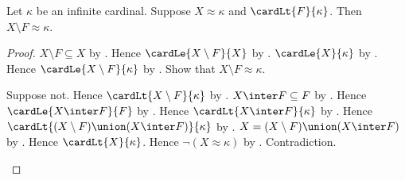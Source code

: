 \begin{theorem}\label{large_minus_small}
    Let $\kappa$ be an infinite cardinal.
    Suppose $X\approx\kappa$ and $\cardLt{F}{\kappa}$.
    Then $X\setminus F\approx\kappa$.
\end{theorem}
\begin{proof}
    $X\setminus F\subseteq X$ by .
    Hence $\cardLe{X\setminus F}{X}$ by
        .
    $\cardLe{X}{\kappa}$ by .
    Hence $\cardLe{X\setminus F}{\kappa}$ by
        .
    Show that $X\setminus F\approx\kappa$.
    \begin{subproof}
        Suppose not.
        Hence $\cardLt{X\setminus F}{\kappa}$ by
            .
        $X\inter F\subseteq F$ by .
        Hence $\cardLe{X\inter F}{F}$ by
            .
        Hence $\cardLt{X\inter F}{\kappa}$ by
            .
        Hence $\cardLt{(X\setminus F)\union(X\inter F)}{\kappa}$ by
            .
        $X=(X\setminus F)\union(X\inter F)$ by
            .
        Hence $\cardLt{X}{\kappa}$.
        Hence $\lnot(X\approx\kappa)$ by .
        Contradiction.
    \end{subproof}
\end{proof}


